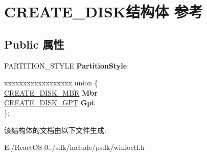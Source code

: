 \hypertarget{struct_c_r_e_a_t_e___d_i_s_k}{}\section{C\+R\+E\+A\+T\+E\+\_\+\+D\+I\+S\+K结构体 参考}
\label{struct_c_r_e_a_t_e___d_i_s_k}
\subsection*{Public 属性}
\begin{DoxyCompactItemize}
\item 
\mbox{\label{struct_c_r_e_a_t_e___d_i_s_k_a7920e6a7035124060f2dac075c182961}} 
P\+A\+R\+T\+I\+T\+I\+O\+N\+\_\+\+S\+T\+Y\+LE {\bfseries Partition\+Style}
\item 
\mbox{\label{struct_c_r_e_a_t_e___d_i_s_k_ae8e0a8b6f4b335755db5e559b3f6cee5}} 
\begin{tabbing}
xx\=xx\=xx\=xx\=xx\=xx\=xx\=xx\=xx\=\kill
union \{\\
\>\hyperlink{struct_c_r_e_a_t_e___d_i_s_k___m_b_r}{CREATE\_DISK\_MBR} {\bfseries Mbr}\\
\>\hyperlink{struct_c_r_e_a_t_e___d_i_s_k___g_p_t}{CREATE\_DISK\_GPT} {\bfseries Gpt}\\
\}; \\

\end{tabbing}\end{DoxyCompactItemize}


该结构体的文档由以下文件生成\+:\begin{DoxyCompactItemize}
\item 
E\+:/\+React\+O\+S-\/0../sdk/include/psdk/winioctl.\+h\end{DoxyCompactItemize}
